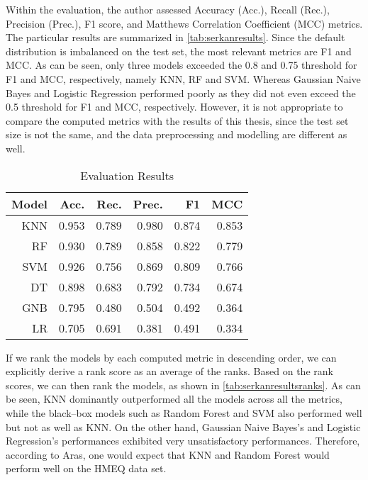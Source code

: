 Within the evaluation, the author assessed Accuracy (Acc.), Recall (Rec.), Precision (Prec.), F1 score, and Matthews Correlation Coefficient (MCC) metrics. The particular results are summarized in \autoref{tab:serkanresults}.
Since the default distribution is imbalanced on the test set, the most relevant metrics are F1 and MCC.
As can be seen, only three models exceeded the 0.8 and 0.75 threshold for F1 and MCC, respectively, namely KNN, RF and SVM. Whereas Gaussian Naive Bayes and Logistic Regression performed poorly as they did not even exceed the 0.5 threshold for F1 and MCC, respectively.
However, it is not appropriate to compare the computed metrics with the results of this thesis, since the test set size is not the same, and the data preprocessing and modelling are different as well.
\begin{table}[H]
    \small
    \setlength{\tabcolsep}{8pt}
    \renewcommand{\arraystretch}{1.3}
    \centering
    \caption[Evaluation Results \citep{serkan2021bagging}]{Evaluation Results \citep{serkan2021bagging}}\label{tab:serkanresults}
    \begin{tabular}{r r r r r r}
    \toprule
    \textbf{Model} & \textbf{Acc.} & \textbf{Rec.} & \textbf{Prec.} & \textbf{F1} & \textbf{MCC} \\
    \midrule
    \hline
	
	KNN & 0.953 & 0.789 & 0.980 & 0.874 & 0.853 \\
    RF & 0.930 & 0.789 & 0.858 & 0.822 & 0.779 \\
    SVM & 0.926 & 0.756 & 0.869 & 0.809 & 0.766 \\
    DT & 0.898 & 0.683 & 0.792 & 0.734 & 0.674 \\
    GNB & 0.795 & 0.480 & 0.504 & 0.492 & 0.364 \\
	LR & 0.705 & 0.691 & 0.381 & 0.491 & 0.334 \\
	
    \hline
    \bottomrule
    \end{tabular}
    \vspace{0.35em}
    
    \vspace{-1em}
\end{table}

If we rank the models by each computed metric in descending order, we can explicitly derive a rank score as an average of the ranks. Based on the rank scores, we can then rank the models, as shown in \autoref{tab:serkanresultsranks}. As can be seen, KNN dominantly outperformed all the models across all the metrics, while the black--box models such as Random Forest and SVM also performed well but not as well as KNN.
On the other hand, Gaussian Naive Bayes's and Logistic Regression's performances exhibited very unsatisfactory performances.
Therefore, according to Aras, one would expect that KNN and Random Forest would perform well on the HMEQ data set.

